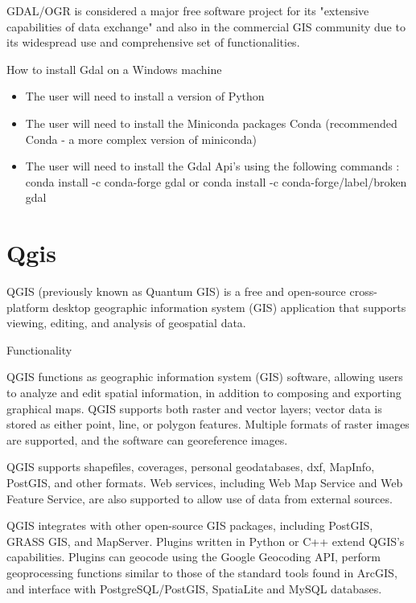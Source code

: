 \documentclass[12pt, a4paper]{report}
\begin{document}
	GDAL/OGR is considered a major free software project for its "extensive capabilities of data exchange" and also in the commercial GIS community due to its widespread use and comprehensive set of functionalities.

{\Large How to install Gdal on a Windows machine\par}

\begin{itemize}
  \item The user will need to install a version of Python
  \item The user will need to install the Miniconda packages Conda (recommended Conda - a more complex version of miniconda)
  \item The user will need to install the Gdal Api's using the following commands : conda install -c conda-forge gdal or conda install -c conda-forge/label/broken gdal
\end{itemize}



\newpage{}

\section{Qgis} 

QGIS (previously known as Quantum GIS) is a free and open-source cross-platform desktop geographic information system (GIS) application that supports viewing, editing, and analysis of geospatial data. 

{\Large Functionality \par}

	QGIS functions as geographic information system (GIS) software, allowing users to analyze and edit spatial information, in addition to composing and exporting graphical maps. QGIS supports both raster and vector layers; vector data is stored as either point, line, or polygon features. Multiple formats of raster images are supported, and the software can georeference images.

	QGIS supports shapefiles, coverages, personal geodatabases, dxf, MapInfo, PostGIS, and other formats. Web services, including Web Map Service and Web Feature Service, are also supported to allow use of data from external sources.

	QGIS integrates with other open-source GIS packages, including PostGIS, GRASS GIS, and MapServer. Plugins written in Python or C++ extend QGIS's capabilities. Plugins can geocode using the Google Geocoding API, perform geoprocessing functions similar to those of the standard tools found in ArcGIS, and interface with PostgreSQL/PostGIS, SpatiaLite and MySQL databases. 
\end{document}
